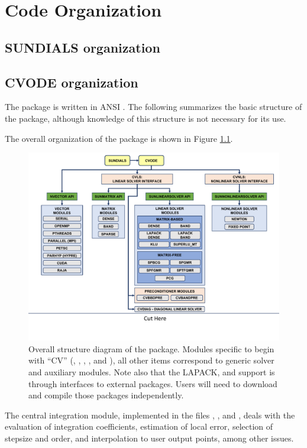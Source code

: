 \chapter{Code Organization}\label{s:organization}

\section{SUNDIALS organization}\label{ss:sun_org}


\section{CVODE organization}\label{ss:cvode_org}

The {\cvode} package is written in ANSI {\CC}. The following
summarizes the basic structure of the package, although knowledge
of this structure is not necessary for its use.

The overall organization of the {\cvode} package is shown in Figure
\ref{f:cvorg}.
\begin{figure}[!ht]
{\centerline{\includegraphics[width=\textwidth]{cvorg}}}
\caption [Overall structure diagram of the {\cvode} package]
{Overall structure diagram of the {\cvode} package.
  Modules specific to {\cvode} begin with ``CV'' ({\cvls},  {\cvdiag},
  {\cvbbdpre}, {\cvbandpre}, and {\cvnls}), all other items correspond
  to generic solver and auxiliary modules. 
  Note also that the LAPACK, {\klu} and {\superlumt} support is
  through interfaces to external packages.  Users will need to
  download and compile those packages independently.}
\label{f:cvorg}
\end{figure}
The central integration module, implemented in the files ,
, and , deals with the evaluation of integration
coefficients, estimation of local
error, selection of stepsize and order, and interpolation to user output
points, among other issues.


